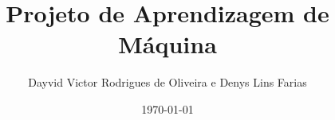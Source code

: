 \documentclass[11pt,a4paper,openright]{report}
\begin{document}
\title{Projeto de Aprendizagem de Máquina}
\author{Dayvid Victor Rodrigues de Oliveira e Denys Lins Farias}
\date{\today}

\maketitle



\tableofcontents

\listoftables
\listoffigures

\cleardoublepage
\setcounter{page}{1}








\end{document}
